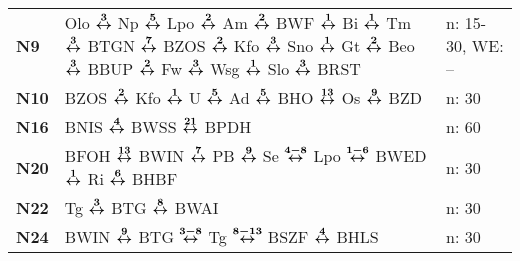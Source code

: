 \begin{minipage}[t]{0.45\textwidth}
\begin{tabular}{>{\bfseries}L{1.2cm}L{9.0cm}L{3.0cm}}
\nbus{} N9    & Olo $\xarwe{3}$ Np $\xarwe{5}$ Lpo $\xarwe{2}$ Am $\xarwe{2}$ BWF $\xarwe{1}$ Bi $\xarwe{1}$ Tm $\xarwe{3}$ BTGN $\xarwe{7}$ BZOS $\xarwe{2}$ Kfo $\xarwe{3}$ Sno   %
                $\xarwe{1}$ Gt $\xarwe{2}$ Beo $\xarwe{3}$ BBUP $\xarwe{2}$ Fw $\xarwe{3}$ Wsg $\xarwe{1}$ Slo $\xarwe{3}$ BRST                                                     & n: 15-30, WE: --           \\ 
\nbus{} N10   & BZOS $\xarwe{2}$ Kfo $\xarwe{1}$ U $\xarwe{5}$ Ad $\xarwe{5}$ BHO $\xarwe{13}$ Os $\xarwe{9}$ BZD                                                                   & n: 30                      \\
\nbus{} N16   & BNIS $\xarwe{4}$ BWSS $\xarwe{21}$ BPDH                                                                                                                             & n: 60                      \\
\nbus{} N20   & BFOH $\xarwe{13}$ BWIN $\xarwe{7}$ PB $\xarwe{9}$ Se $\xarwe{4-8}$ Lpo $\xarwe{1-6}$ BWED $\xarwe{1}$ Ri $\xarwe{6}$ BHBF                                           & n: 30                      \\
\nbus{} N22   & Tg $\xarwe{3}$ BTG $\xarwe{8}$ BWAI                                                                                                                                 & n: 30                      \\
\nbus{} N24   & BWIN $\xarwe{9}$ BTG $\xarwe{3-8}$ Tg $\xarwe{8-13}$ BSZF $\xarwe{4}$ BHLS                                                                                          & n: 30                      \\
\hline
\end{tabular}
\end{minipage}
